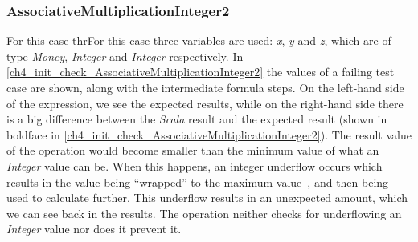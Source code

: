 \subsubsection{AssociativeMultiplicationInteger2}
For this case thrFor this case three variables are used: \textit{x}, \textit{y} and \textit{z},
which are of type \textit{Money}, \textit{Integer} and \textit{Integer}
respectively. In \autoref{ch4_init_check_AssociativeMultiplicationInteger2} the
values of a failing test case are shown, along with the intermediate formula
steps. On the left-hand side of the expression, we see the expected results,
while on the right-hand side there is a big difference between the
\textit{Scala} result and the expected result (shown in boldface in
\autoref{ch4_init_check_AssociativeMultiplicationInteger2}). The result value of
the operation would become smaller than the minimum value of what an
\textit{Integer} value can be. When this happens, an integer underflow occurs
which results in the value being ``wrapped'' to the maximum
value~\cite{brumley2007rich}, and then being used to calculate further. This
underflow results in an unexpected amount, which we can see back in the results.
The operation neither checks for underflowing an \textit{Integer} value nor does
it prevent it.
\FloatBarrier
